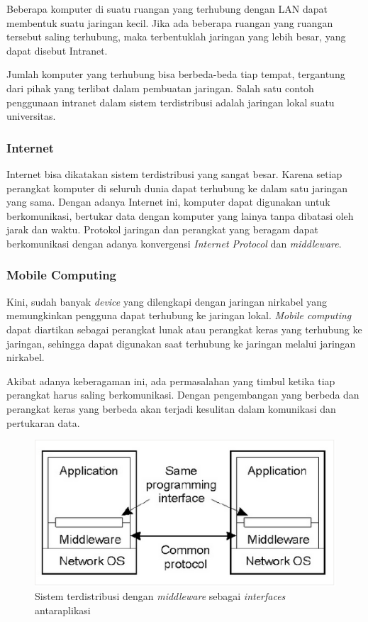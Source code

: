 \documentclass[12pt,a4paper]{apa}
\begin{document}
		Beberapa komputer di suatu ruangan yang terhubung dengan LAN dapat membentuk suatu jaringan kecil. Jika ada beberapa ruangan yang ruangan tersebut saling terhubung, maka terbentuklah jaringan yang lebih besar, yang dapat disebut Intranet.
		
		Jumlah komputer yang terhubung bisa berbeda-beda tiap tempat, tergantung dari pihak yang terlibat dalam pembuatan jaringan. Salah satu contoh penggunaan intranet dalam sistem terdistribusi adalah jaringan lokal suatu universitas.
		
	\subsubsection{\textbf{Internet}}
		
		Internet bisa dikatakan sistem terdistribusi yang sangat besar. Karena setiap perangkat komputer di seluruh dunia dapat terhubung ke dalam satu jaringan yang sama. Dengan adanya Internet ini, komputer dapat digunakan untuk berkomunikasi, bertukar data dengan komputer yang lainya tanpa dibatasi oleh jarak dan waktu. Protokol jaringan dan perangkat yang beragam dapat berkomunikasi dengan adanya konvergensi \emph{Internet Protocol} dan \emph{middleware}.
		
	\subsubsection{\textbf{Mobile Computing}}
		
		Kini, sudah banyak \emph{device} yang dilengkapi dengan jaringan nirkabel yang memungkinkan pengguna dapat terhubung ke jaringan lokal. \emph{Mobile computing} dapat diartikan sebagai perangkat lunak atau perangkat keras yang terhubung ke jaringan, sehingga dapat digunakan saat terhubung ke jaringan melalui jaringan nirkabel.
		
		Akibat adanya keberagaman ini, ada permasalahan yang timbul ketika tiap perangkat harus saling berkomunikasi. Dengan pengembangan yang berbeda dan perangkat keras yang berbeda akan terjadi kesulitan dalam komunikasi dan pertukaran data.
		
		\begin{figure}[h]
		\centering
		\includegraphics[width=0.5\linewidth]{img/middleware}
		\caption{Sistem terdistribusi dengan \emph{middleware} sebagai \emph{interfaces} antaraplikasi}
		\label{fig:middleware}
		\end{figure}
\end{document}
